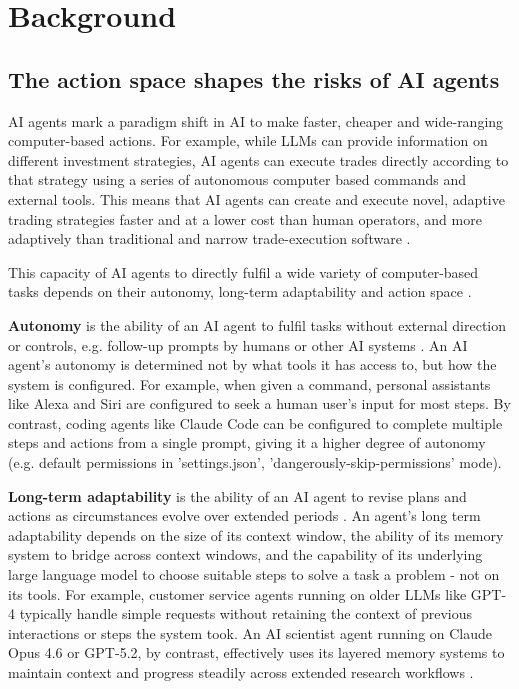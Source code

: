 \documentclass[manuscript,screen,nonacm,oneside]{acmart}
\begin{document}
\section{Background}
\label{sec:background}
\subsection{The action space shapes the risks of AI agents}
AI agents mark a paradigm shift in AI to make faster, cheaper and wide-ranging computer-based actions. For example, while LLMs can provide information on different investment strategies, AI agents can execute trades directly according to that strategy using a series of autonomous computer based commands and external tools. This means that AI agents can create and execute novel, adaptive trading strategies faster and at a lower cost than human operators, and more adaptively than traditional and narrow trade-execution software \citep{li2025hedgeagents}. 

This capacity of AI agents to directly fulfil a wide variety of computer-based tasks depends on their autonomy, long-term adaptability and action space \citep{kasirzadeh2025characterizing, chan2023harms, imda}. 

\textbf{Autonomy} is the ability of an AI agent to fulfil tasks without external direction or controls, e.g. follow-up prompts by humans or other AI systems \citep{cihon2025measuring}. An AI agent's autonomy is determined not by what tools it has access to, but how the system is configured. For example, when given a command, personal assistants like Alexa and Siri are configured to seek a human user's input for most steps. By contrast, coding agents like Claude Code can be configured to complete multiple steps and actions from a single prompt, giving it a higher degree of autonomy (e.g. default permissions in 'settings.json', 'dangerously-skip-permissions' mode).

\textbf{Long-term adaptability} is the ability of an AI agent to revise plans and actions as circumstances evolve over extended periods \citep{chan2023harms}. An agent's long term adaptability depends on the size of its context window, the ability of its memory system to bridge across context windows, and the capability of its underlying large language model to choose suitable steps to solve a task a problem - not on its tools. For example, customer service agents running on older LLMs like GPT-4 typically handle simple requests without retaining the context of previous interactions or steps the system took. An AI scientist agent running on Claude Opus 4.6 or GPT-5.2, by contrast, effectively uses its layered memory systems to maintain context and progress steadily across extended research workflows \citep{lu2024aiscientist}. 
\end{document}
